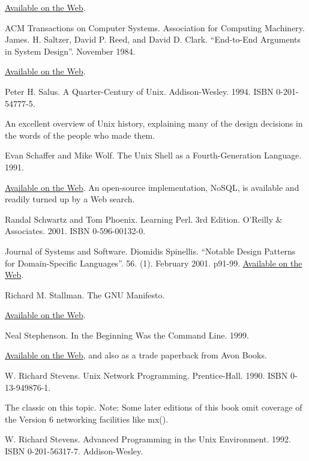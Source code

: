 \documentclass[12pt,oneside]{book}
\begin{document}
\begin{thebibliography}{9}
\href{http://cm.bell-labs.com/cm/cs/who/dmr/cacm.html}{Available on the Web}.

 ACM Transactions on Computer Systems. Association for Computing Machinery. James. H. Saltzer, David P. Reed, and David D. Clark. “End-to-End Arguments in System Design”. November 1984.

\href{http://web.mit.edu/Saltzer/www/publications/endtoend/endtoend.pdf}{Available on the Web}.

 Peter H. Salus. A Quarter-Century of Unix. Addison-Wesley. 1994. ISBN 0-201-54777-5.

An excellent overview of Unix history, explaining many of the design decisions in the words of the people who made them.

 Evan Schaffer and Mike Wolf. The Unix Shell as a Fourth-Generation Language. 1991.

\href{http://www.rdb.com/lib/4gl.pdf}{Available on the Web}. An open-source implementation, NoSQL, is available and readily turned up by a Web search.

 Randal Schwartz and Tom Phoenix. Learning Perl. 3rd Edition. O'Reilly \&{} Associates. 2001. ISBN 0-596-00132-0.

 Journal of Systems and Software. Diomidis Spinellis. “Notable Design Patterns for Domain-Specific Languages”. 56. (1). February 2001. p91-99. \href{http://www.catb.org/~esr/writings/taoup/html/apb.html}{Available on the Web}.

 Richard M. Stallman. The GNU Manifesto.

\href{http://www.gnu.org/gnu/manifesto.html}{Available on the Web}.

 Neal Stephenson. In the Beginning Was the Command Line. 1999.

\href{http://www.cryptonomicon.com/beginning.html}{Available on the Web}, and also as a trade paperback from Avon Books.

 W. Richard Stevens. Unix Network Programming. Prentice-Hall. 1990. ISBN 0-13-949876-1.

The classic on this topic. Note: Some later editions of this book omit coverage of the Version 6 networking facilities like mx().

 W. Richard Stevens. Advanced Programming in the Unix Environment. 1992. ISBN 0-201-56317-7. Addison-Wesley.


\end{thebibliography}
\end{document}
